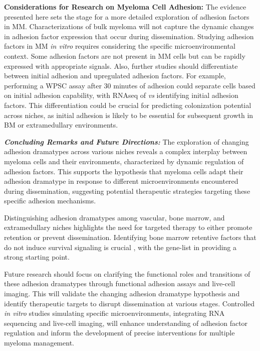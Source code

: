 \textbf{Considerations for Research on Myeloma Cell Adhesion:}
The evidence presented here sets the stage for a more detailed exploration of
adhesion factors in MM. Characterizations of bulk myeloma will not capture
the dynamic changes in adhesion factor expression that occur during dissemination.
Studying adhesion factors in MM \textit{in vitro} requires considering the
specific microenvironmental context. Some adhesion factors are not present in MM
cells but can be rapidly expressed with appropriate signals. Also, further
studies should differentiate between initial adhesion and upregulated adhesion
factors. For example, performing a \ac{WPSC} assay after 30 minutes of adhesion
could separate  cells based on initial adhesion capability, with RNAseq of
\nMAina \textit{vs} \MAina identifying initial adhesion factors. This
differentiation could be crucial for predicting colonization potential across
niches, as initial adhesion is likely to be essential for subsequent growth in
\ac{BM} or extramedullary environments.



\textbf{\textit{Concluding Remarks and Future Directions:}} The exploration of
changing adhesion dramatypes across various niches reveals a complex interplay
between myeloma cells and their environments, characterized by dynamic
regulation of adhesion factors. This supports the hypothesis that myeloma cells
adapt their adhesion dramatype in response to different microenvironments
encountered during dissemination, suggesting potential therapeutic strategies
targeting these specific adhesion mechanisms.

Distinguishing adhesion dramatypes among vascular, bone marrow, and
extramedullary niches highlights the need for targeted therapy to either promote
retention or prevent dissemination. Identifying bone marrow retentive factors
that do not induce survival signaling is crucial ,
with the gene-list in  providing a strong starting
point.

Future research should focus on clarifying the functional roles and transitions
of these adhesion dramatypes through functional adhesion assays and live-cell
imaging. This will validate the changing adhesion dramatype hypothesis and
identify therapeutic targets to disrupt dissemination at various stages.
Controlled \textit{in vitro} studies simulating specific microenvironments,
integrating RNA sequencing and live-cell imaging, will enhance understanding of
adhesion factor regulation and inform the development of precise interventions
for multiple myeloma management.




